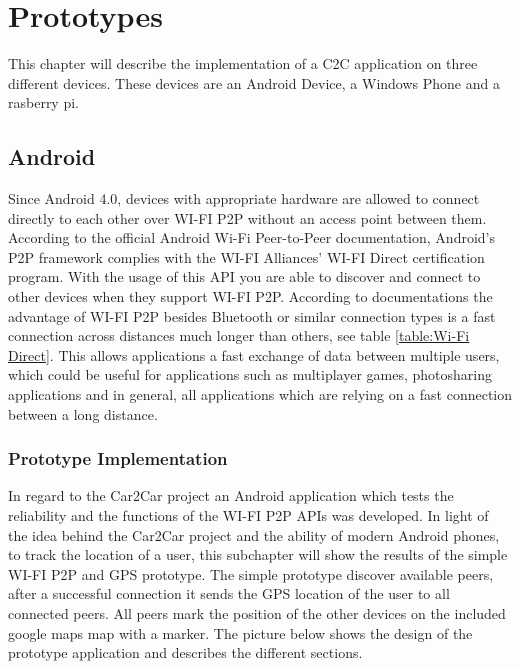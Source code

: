 \chapter{Prototypes}
\label{cha:Prototypes}
This chapter will describe the implementation of a C2C application on three different devices. These devices are an Android Device, a Windows Phone and a rasberry pi.

\section{Android}
Since Android 4.0, devices with appropriate hardware are allowed to connect directly to each other over WI-FI P2P without an access point between them. According to the official Android Wi-Fi Peer-to-Peer documentation, Android's P2P framework complies with the WI-FI Alliances' WI-FI Direct certification program. With the usage of this API you are able to discover and connect to other devices when they support WI-FI P2P.  According to documentations the advantage of WI-FI P2P besides Bluetooth or similar connection types is a fast connection across distances much longer than others, see table \ref{table:Wi-Fi Direct}. This allows applications a fast exchange of data between multiple users, which could be useful for applications such as multiplayer games, photosharing applications and in general, all applications which are relying on a fast connection between a long distance\cite{wifip2p2}.

\subsection*{Prototype Implementation}
\label{subsec:AndroidPrototype}
In regard to the Car2Car project an Android application which tests the reliability and the functions of the WI-FI P2P APIs was developed. In light of the idea behind the Car2Car project and the ability of modern Android phones, to track the location of a user, this subchapter will show the results of the simple WI-FI P2P and GPS prototype.
The simple prototype discover available peers, after a successful connection it  sends the GPS location of the user to all connected peers. All peers mark the position of the other devices on the included google maps map with a marker. The picture below shows the design of the prototype application and describes the different sections.

